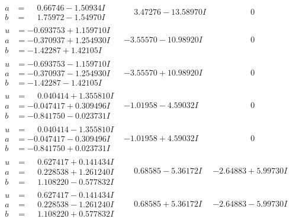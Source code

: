 \documentclass[1p]{elsarticle_modified}
\theoremstyle{definition}
\begin{document}
$$\begin{array}{c|c|c}
\begin{aligned}
a &= \phantom{-}0.66746 - 1.50934 I \\
b &= \phantom{-}1.75972 - 1.54970 I\end{aligned}
 & \phantom{-}3.47276 - 13.58970 I & \phantom{-0.000000 } 0 \\ \hline\begin{aligned}
u &= -0.693753 + 1.159710 I \\
a &= -0.370937 + 1.254930 I \\
b &= -1.42287 + 1.42105 I\end{aligned}
 & -3.55570 - 10.98920 I & \phantom{-0.000000 } 0 \\ \hline\begin{aligned}
u &= -0.693753 - 1.159710 I \\
a &= -0.370937 - 1.254930 I \\
b &= -1.42287 - 1.42105 I\end{aligned}
 & -3.55570 + 10.98920 I & \phantom{-0.000000 } 0 \\ \hline\begin{aligned}
u &= \phantom{-}0.040414 + 1.355810 I \\
a &= -0.047417 + 0.309496 I \\
b &= -0.841750 - 0.023731 I\end{aligned}
 & -1.01958 - 4.59032 I & \phantom{-0.000000 } 0 \\ \hline\begin{aligned}
u &= \phantom{-}0.040414 - 1.355810 I \\
a &= -0.047417 - 0.309496 I \\
b &= -0.841750 + 0.023731 I\end{aligned}
 & -1.01958 + 4.59032 I & \phantom{-0.000000 } 0 \\ \hline\begin{aligned}
u &= \phantom{-}0.627417 + 0.141434 I \\
a &= \phantom{-}0.228538 + 1.261240 I \\
b &= \phantom{-}1.108220 - 0.577832 I\end{aligned}
 & \phantom{-}0.68585 - 5.36172 I & -2.64883 + 5.99730 I \\ \hline\begin{aligned}
u &= \phantom{-}0.627417 - 0.141434 I \\
a &= \phantom{-}0.228538 - 1.261240 I \\
b &= \phantom{-}1.108220 + 0.577832 I\end{aligned}
 & \phantom{-}0.68585 + 5.36172 I & -2.64883 - 5.99730 I \\ \hline\begin{aligned}

\end{aligned}
\end{array}$$
\end{document}
